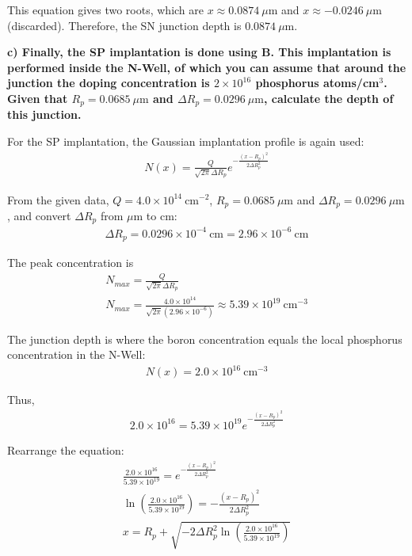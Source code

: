 This equation gives two roots, which are $x \approx 0.0874 \ \mu\mathrm{m}$ and $x \approx -0.0246 \ \mu\mathrm{m}$ (discarded). Therefore, the SN junction depth is $0.0874 \ \mu\mathrm{m}$.


\vspace{0.5em}
\noindent \textbf{c) Finally, the SP implantation is done using B. This implantation is performed inside the N-Well, of which you can assume that around the junction the doping concentration is $2 \times 10^{16}$ phosphorus atoms/cm$^3$. Given that $R_p = 0.0685 \ \mu\mathrm{m}$ and $\Delta R_p = 0.0296 \ \mu\mathrm{m}$, calculate the depth of this junction.}

For the SP implantation, the Gaussian implantation profile is again used:
\begin{gather*}
    N(x)=\frac{Q}{\sqrt{2\pi}\Delta R_p}
    e^{-\frac{(x-R_p)^2}{2\Delta R_p^2}}
\end{gather*}

From the given data, $Q = 4.0 \times 10^{14} \ \mathrm{cm^{-2}}$, $R_p = 0.0685 \ \mu\mathrm{m}$ and $\Delta R_p = 0.0296 \ \mu\mathrm{m}$, and convert $\Delta R_p$ from $\mu\mathrm{m}$ to cm:
\begin{gather*}
    \Delta R_p = 0.0296 \times 10^{-4} \ \mathrm{cm}
    = 2.96 \times 10^{-6} \ \mathrm{cm}
\end{gather*}

The peak concentration is
\begin{gather*}
    N_{max}=\frac{Q}{\sqrt{2\pi}\Delta R_p} \\
    N_{max}=\frac{4.0 \times 10^{14}}
    {\sqrt{2\pi}(2.96 \times 10^{-6})} \approx 5.39 \times 10^{19} \ \mathrm{cm^{-3}}
\end{gather*}

The junction depth is where the boron concentration equals the local phosphorus concentration in the N-Well:
\begin{gather*}
    N(x)=2.0 \times 10^{16} \ \mathrm{cm^{-3}}
\end{gather*}

Thus,
\begin{gather*}
    2.0 \times 10^{16}
    =
    5.39 \times 10^{19}
    e^{-\frac{(x-R_p)^2}{2\Delta R_p^2}}
\end{gather*}

Rearrange the equation:
\begin{gather*}
    \frac{2.0 \times 10^{16}}{5.39 \times 10^{19}}
    =
    e^{-\frac{(x-R_p)^2}{2\Delta R_p^2}} \\
    \ln\left(\frac{2.0 \times 10^{16}}{5.39 \times 10^{19}}\right)
    =
    -\frac{(x-R_p)^2}{2\Delta R_p^2} \\
    x = R_p + \sqrt{-2\Delta R_p^2
    \ln\left(\frac{2.0 \times 10^{16}}{5.39 \times 10^{19}}\right)}
\end{gather*}



